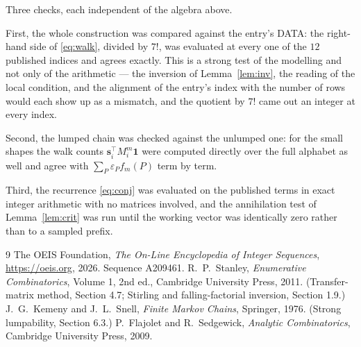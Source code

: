 \documentclass[11pt,a4paper]{article}
\theoremstyle{plain}
\theoremstyle{definition}
\begin{document}
Three checks, each independent of the algebra above.

First, the whole construction was compared against the entry's DATA: the right-hand side of
\eqref{eq:walk}, divided by $7!$, was evaluated at every one of the $12$
published indices and agrees exactly. This is a strong test of the modelling and not only of
the arithmetic --- the inversion of Lemma~\ref{lem:inv}, the reading of the local
condition, and the alignment of the entry's index with the number of rows would each
show up as a mismatch, and the quotient by $7!$ came out an integer at every index.

Second, the lumped chain was checked against the unlumped one: for the small shapes the walk
counts $\mathbf{s}_i^{\!\top}M_i^{m}\mathbf{1}$ were computed directly over the full
alphabet as well and agree with $\sum_P\varepsilon_Pf_m(P)$ term by term.

Third, the recurrence \eqref{eq:conj} was evaluated on the published terms in exact integer
arithmetic with no matrices involved, and the annihilation test of Lemma~\ref{lem:crit} was
run until the working vector was identically zero rather than to a sampled prefix.

\begin{thebibliography}{9}
 The OEIS Foundation, \emph{The On-Line Encyclopedia of Integer
Sequences}, \url{https://oeis.org}, 2026. Sequence A209461.
 R.~P.~Stanley, \emph{Enumerative Combinatorics}, Volume 1, 2nd ed.,
Cambridge University Press, 2011. (Transfer-matrix method, Section 4.7; Stirling and
falling-factorial inversion, Section 1.9.)
 J.~G.~Kemeny and J.~L.~Snell, \emph{Finite Markov Chains}, Springer,
1976. (Strong lumpability, Section 6.3.)
 P.~Flajolet and R.~Sedgewick, \emph{Analytic Combinatorics}, Cambridge
University Press, 2009.
\end{thebibliography}
\end{document}

